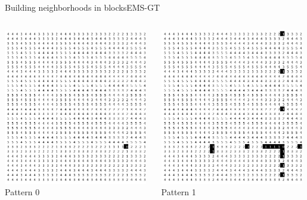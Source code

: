 \documentclass[pdf,xcolor={dvipsnames}]{beamer}
\begin{document}
\begin{frame}{Building neighborhoods in blocks}{EMS-GT}
{\begin{columns}
		\begin{column}{.135\textwidth}\centering\includegraphics[width=0.98\textwidth]{img/0}\\Pattern 0 \end{column} 
		\begin{column}{.135\textwidth}\centering\includegraphics[width=0.98\textwidth]{img/1}\\Pattern 1 \end{column}

\end{columns}}
\end{frame}
\end{document}
